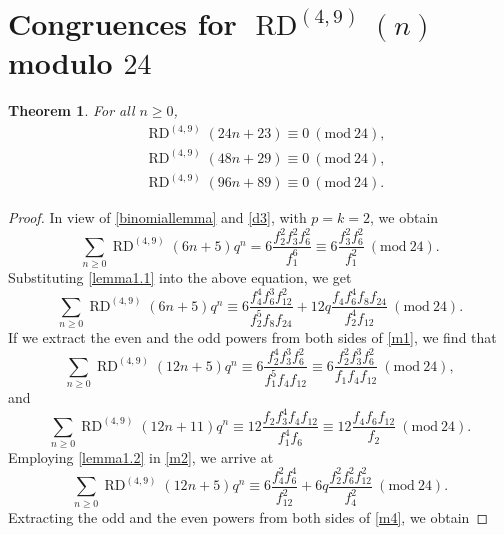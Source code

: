 \documentclass[12pt]{amsart}
\DeclareMathOperator {\myRD}{RD}
\theoremstyle{plain}
\newtheorem{theorem}{Theorem}[section]
\theoremstyle{definition}
\begin{document}
\section{Congruences for $\myRD^{(4, 9)}(n)$ modulo $24$}
\begin{theorem} For all $n\geq 0$,
\begin{align}
& \myRD^{(4, 9)}(24n+23) \equiv  0 \ (\mathrm{mod} \ 24), \label{cong24-1}\\
& \myRD^{(4, 9)}(48n+29) \equiv  0 \ (\mathrm{mod} \ 24),\label{cong24-2}\\
& \myRD^{(4, 9)}(96n+89) \equiv 0 \ (\mathrm{mod} \ 24). \label{cong24-3}
\end{align}
\end{theorem}
 
 \begin{proof} In view of \eqref{binomiallemma} and \eqref{d3}, with $p=k=2$, we obtain
\[
    \sum_{n\geq 0} \myRD^{(4, 9)}(6n+5)q^{n}= 6\dfrac{f_{2}^{2}f_{3}^{2}f_{6}^{2}}{f_{1}^{6}} \equiv 6 \dfrac{f_{3}^{2} f_{6}^{2}}{f_{1}^{2}} \ (\mathrm{mod} \ 24).
\]
 Substituting \eqref{lemma1.1} into the above equation, we get
\begin{equation}
    \sum_{n\geq 0} \myRD^{(4, 9)}(6n+5)q^{n} \equiv 6 \dfrac{f_{4}^{4} f_{6}^{3} f_{12}^{2}}{f_{2}^{5} f_{8} f_{24}}+12q \dfrac{f_{4} f_{6}^{4} f_{8} f_{24}}{f_{2}^{4} f_{12}} \ (\mathrm{mod} \ 24). \label{m1}
\end{equation}
If we extract the even and the odd powers from both sides of \eqref{m1}, we find that
\begin{equation}
    \sum_{n\geq 0} \myRD^{(4, 9)}(12n+5)q^{n} \equiv 6 \dfrac{f_{2}^{4} f_{3}^{3} f_{6}^{2}}{f_{1}^{5} f_{4} f_{12}} \equiv 6 \dfrac{f_{2}^{2} f_{3}^{3} f_{6}^{2}}{f_{1} f_{4} f_{12}} \ (\mathrm{mod} \ 24), \label{m2}
\end{equation}
and
\begin{equation}
    \sum_{n\geq 0} \myRD^{(4, 9)}(12n+11)q^{n} \equiv 12 \dfrac{f_{2} f_{3}^{4} f_{4} f_{12}}{f_{1}^{4} f_{6}} \equiv 12 \dfrac{f_{4} f_{6} f_{12}}{f_{2}} \ (\mathrm{mod} \ 24). \label{m3}
\end{equation}
Employing \eqref{lemma1.2} in \eqref{m2}, we arrive at
\begin{equation}
    \sum_{n\geq 0} \myRD^{(4, 9)}(12n+5)q^{n} \equiv 6 \dfrac{f_{4}^{2} f_{6}^{4}}{f_{12}^{2}} + 6 q \dfrac{f_{2}^{2}  f_{6}^{2} f_{12}^{2}}{f_{4}^{2}} \ (\mathrm{mod} \ 24). \label{m4}
\end{equation}
Extracting the odd and the even powers from both sides of \eqref{m4}, we obtain

\end{proof}
\end{document}
